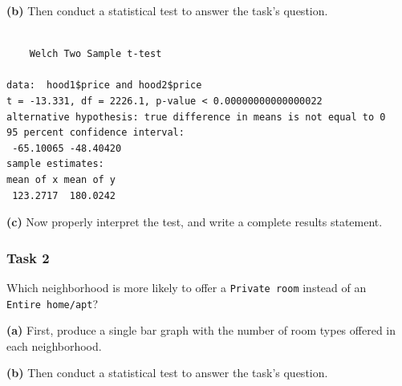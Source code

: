\documentclass[]{book}
\newenvironment{Shaded}{\begin{snugshade}}{\end{snugshade}}
\newcommand{\KeywordTok}[1]{\textcolor[rgb]{0.13,0.29,0.53}{\textbf{#1}}}
\newcommand{\NormalTok}[1]{#1}
\newcommand{\OperatorTok}[1]{\textcolor[rgb]{0.81,0.36,0.00}{\textbf{#1}}}
\begin{document}
\textbf{(b)} Then conduct a statistical test to answer the task's question.

\begin{Shaded}
\end{Shaded}

\begin{verbatim}

    Welch Two Sample t-test

data:  hood1$price and hood2$price
t = -13.331, df = 2226.1, p-value < 0.00000000000000022
alternative hypothesis: true difference in means is not equal to 0
95 percent confidence interval:
 -65.10065 -48.40420
sample estimates:
mean of x mean of y 
 123.2717  180.0242 
\end{verbatim}

\textbf{(c)} Now properly interpret the test, and write a complete results statement.

\hypertarget{task-2-1}{%
\subsubsection*{Task 2}\label{task-2-1}}

Which neighborhood is more likely to offer a \texttt{Private\ room} instead of an \texttt{Entire\ home/apt}?

\textbf{(a)} First, produce a single bar graph with the number of room types offered in each neighborhood.

\textbf{(b)} Then conduct a statistical test to answer the task's question.
\end{document}

